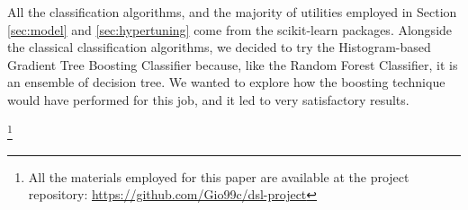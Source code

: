 \documentclass[conference]{IEEEtran}
\begin{document}
All the classification algorithms, and the majority of utilities employed in Section \ref{sec:model} and \ref{sec:hypertuning} come from the scikit-learn packages\cite{scikit-learn}. Alongside the classical classification algorithms, we decided to try the Histogram-based Gradient Tree Boosting Classifier because, like the Random Forest Classifier, it is an ensemble of decision tree. We wanted to explore how the boosting technique would have performed for this job, and it led to very satisfactory results.

\footnote{All the materials employed for this paper are available at the project repository: \url{https://github.com/Gio99c/dsl-project}}
\end{document}
